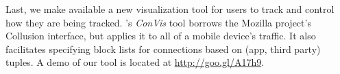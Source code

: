 Last, we make available a new visualization tool for users to track and control how 
they are being tracked. \platname{}'s \emph{ConVis} tool borrows the Mozilla project's Collusion 
interface, but applies it to all of a mobile device's traffic. It also facilitates specifying block lists for connections
 based on (app, third party) tuples. A demo of our tool is located at \url{http://goo.gl/A17h9}.


%



